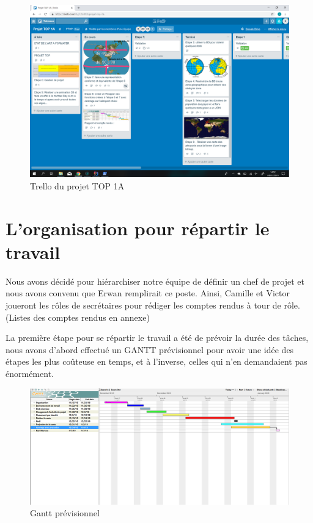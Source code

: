 \documentclass{article}
\begin{document}
\begin{figure}[H]
	\centering
	\includegraphics[scale=0.2]{trello}
	\caption{Trello du projet TOP 1A}
	\label{fig:trello}
\end{figure}

\vspace{1\baselineskip}


\section{ L'organisation pour répartir le travail }


Nous avons décidé pour hiérarchiser notre équipe de définir un chef de projet et nous avons convenu que Erwan remplirait ce poste.
Ainsi, Camille et Victor joueront les rôles de secrétaires pour rédiger les comptes rendus à tour de rôle. (Listes des comptes rendus en annexe)

\vspace{1\baselineskip}

La première étape pour se répartir le travail a été de prévoir la durée des tâches, nous avons d’abord effectué un GANTT prévisionnel pour avoir une idée des étapes les plus coûteuse en temps, et à l’inverse, celles qui n’en demandaient pas énormément.

\vspace{1\baselineskip}

\begin{figure}[H]
    \centering
    \includegraphics[scale=0.4]{gantt.png}
    \caption{Gantt prévisionnel}
    \label{fig:gantt}
\end{figure}
\end{document}
